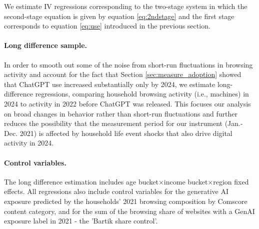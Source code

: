 \documentclass[12pt]{article}
\begin{document}
We estimate IV regressions corresponding to the two-stage system in which the second-stage equation is given by equation \ref{eq:2ndstage} and the first stage corresponds to equation \ref{eq:use} introduced in the previous section.

\paragraph{Long difference sample.} In order to smooth out some of the noise from short-run fluctuations in browsing activity and account for the fact that Section \ref{sec:measure_adoption} showed that ChatGPT use increased substantially only by 2024, we estimate long-difference regressions, comparing household browsing activity (i.e., machines) in 2024 to activity in 2022 before ChatGPT was released. This focuses our analysis on broad changes in behavior rather than short-run fluctuations and further reduces the possibility that the measurement period for our instrument (Jan.-Dec. 2021) is affected by household life event shocks that also drive digital activity in 2024.

\paragraph{Control variables.} The long difference estimation includes age bucket$\times$income bucket$\times$region fixed effects. All regressions also include control variables for the generative AI exposure predicted by the households' 2021 browsing composition by Comscore content category, and for the sum of the browsing share of websites with a GenAI exposure label in 2021 - the 'Bartik share control'.
\end{document}
